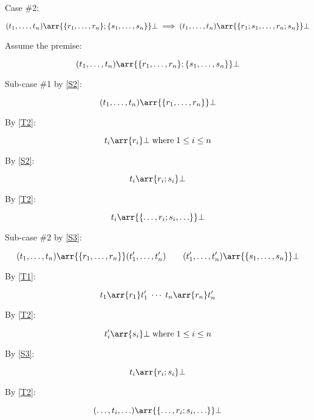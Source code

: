 Case \#2:

\begin{equation}
(t_1,\ldots,t_n) \arr{\{r_1,\ldots,r_n\};\{s_1,\ldots,s_n\}} \bot \implies (t_1,\ldots,t_n) \arr{\{r_1;s_1,\ldots,r_n;s_n\}} \bot
\end{equation}

Assume the premise:

\begin{equation}
(t_1,\ldots,t_n) \arr{\{r_1,\ldots,r_n\};\{s_1,\ldots,s_n\}} \bot
\end{equation}

Sub-case \#1 by \eqref{S2}:

\begin{equation}
(t_1,\ldots,t_n) \arr{\{r_1,\ldots,r_n\}} \bot
\end{equation}

By \eqref{T2}:

\begin{equation}
t_i \arr{r_i} \bot \;\mbox{where}\; 1 \leq i \leq n
\end{equation}

By \eqref{S2}:

\begin{equation}
t_i \arr{r_i;s_i} \bot
\end{equation}

By \eqref{T2}:

\begin{equation}
t_i \arr{\{\ldots,r_i;s_i,\ldots\}} \bot
\end{equation}

Sub-case \#2 by \eqref{S3}:

\begin{equation}
(t_1,\ldots,t_n) \arr{\{r_1,\ldots,r_n\}} (t'_1,\ldots,t'_n)
\qquad
(t'_1,\ldots,t'_n) \arr{\{s_1,\ldots,s_n\}} \bot
\end{equation}

By \eqref{T1}:

\begin{equation}
t_1 \arr{r_1} t'_1 \;\cdots\; t_n \arr{r_n} t'_n
\end{equation}

By \eqref{T2}:

\begin{equation}
t'_i \arr{s_i} \bot \;\mbox{where}\; 1 \leq i \leq n
\end{equation}

By \eqref{S3}:

\begin{equation}
t_i \arr{r_i;s_i} \bot
\end{equation}

By \eqref{T2}:

\begin{equation}
(\ldots,t_i,\ldots) \arr{\{\ldots,r_i;s_i,\ldots\}} \bot
\end{equation}
